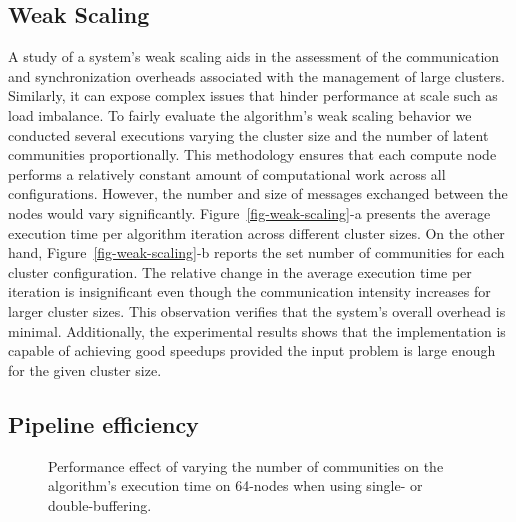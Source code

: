 \subsection{Weak Scaling}

\begin{figure*}[t] %
  \centering
  \caption{(a) Average execution time per algorithm iteration varying
  the number of latent communities proportionally to the number of compute
  nodes. (b) The exact number of communities used for each data point in (a).}
  \label{fig-weak-scaling}
\end{figure*}

A study of a system's weak scaling aids in the assessment of the communication
and synchronization overheads associated with the management of large clusters.
Similarly, it can expose complex issues that hinder performance at scale such
as load imbalance. To fairly evaluate the algorithm's weak scaling behavior we
conducted several executions varying the cluster size and the number of latent
communities proportionally. This methodology ensures that each compute node
performs a relatively constant amount of computational work across all
configurations. However, the number and size of messages exchanged between the
nodes would vary significantly. Figure~\ref{fig-weak-scaling}-a presents the
average execution
time per algorithm iteration across different cluster sizes. On the other hand,
Figure~\ref{fig-weak-scaling}-b reports the set number of communities for each
cluster configuration. The relative change in the average execution time per
iteration is insignificant even though the communication intensity increases
for larger cluster sizes. This observation verifies that the system's overall
overhead is minimal. Additionally, the experimental results shows that the
implementation is capable of achieving good speedups provided the input problem
is large enough for the given cluster size.

\subsection{Pipeline efficiency}

\begin{figure}[t] %
  \centering
  \caption{Performance effect of varying the number of communities on the
    algorithm's execution time on 64-nodes when using single- or
    double-buffering.}
  \label{fig-pipeline}
\end{figure}

